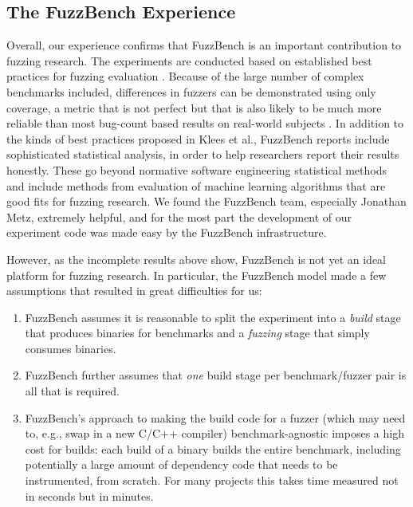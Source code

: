 \subsection{The FuzzBench Experience}
\label{sec:fuzzexp}

Overall, our experience confirms that FuzzBench is an important contribution to fuzzing research.  The experiments are conducted based on established best practices for fuzzing evaluation \cite{evalfuzz}.  Because of the large number of complex benchmarks included, differences in fuzzers can be demonstrated using only coverage, a metric that is not perfect \cite{FuzzAppeal} but that is also likely to be much more reliable than most bug-count based results on real-world subjects \cite{FuzzAppeal,PLDI13}.  In addition to the kinds of best practices proposed in Klees et al., FuzzBench reports include sophisticated statistical analysis, in order to help researchers report their results honestly.  These go beyond normative software engineering statistical methods \cite{arcuri2014hitchhiker} and include methods from evaluation of machine learning algorithms \cite{CompClass} that are good fits for fuzzing research.  We found the FuzzBench team, especially Jonathan Metz, extremely helpful, and for the most part the development of our experiment code was made easy by the FuzzBench infrastructure.

However, as the incomplete results above show, FuzzBench is not yet an ideal platform for fuzzing research.  In particular, the FuzzBench model made a few assumptions that resulted in great difficulties for us:

\begin{enumerate}
\item FuzzBench assumes it is reasonable to split the experiment into a \emph{build} stage that produces binaries for benchmarks and a \emph{fuzzing} stage that simply consumes binaries.
\item FuzzBench further assumes that \emph{one} build stage per benchmark/fuzzer pair is all that is required.
\item FuzzBench's approach to making the build code for a fuzzer (which may need to, e.g., swap in a new C/C++ compiler) benchmark-agnostic imposes a high cost for builds: each build of a binary builds the entire benchmark, including potentially a large amount of dependency code that needs to be instrumented, from scratch.  For many projects this takes time measured not in seconds but in minutes.
\end{enumerate}

